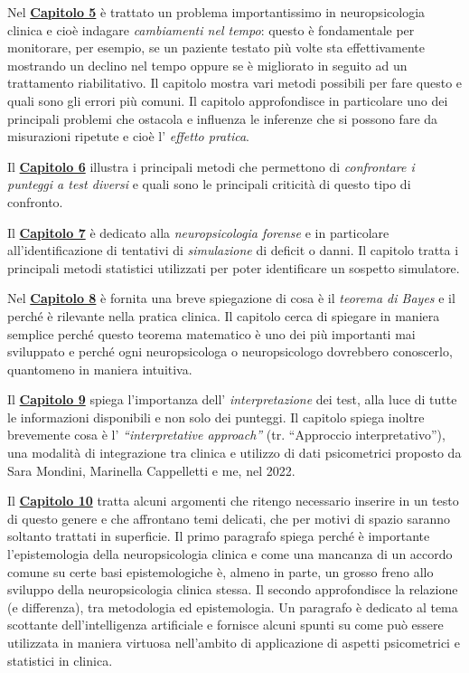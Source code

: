\documentclass[
  italian,
  letterpaper,
  paper=A4,
  headinclude=on,
  footinclude=on,
  12pt]{scrbook}
\begin{document}
Nel \hyperref[Capitolo-5]{\textbf{Capitolo 5}} è trattato un problema
importantissimo in neuropsicologia clinica e cioè indagare
\emph{cambiamenti nel tempo}: questo è fondamentale per monitorare, per
esempio, se un paziente testato più volte sta effettivamente mostrando
un declino nel tempo oppure se è migliorato in seguito ad un trattamento
riabilitativo. Il capitolo mostra vari metodi possibili per fare questo
e quali sono gli errori più comuni. Il capitolo approfondisce in
particolare uno dei principali problemi che ostacola e influenza le
inferenze che si possono fare da misurazioni ripetute e cioè l'
\emph{effetto pratica}.

Il \hyperref[Capitolo-6]{\textbf{Capitolo 6}} illustra i principali
metodi che permettono di \emph{confrontare i punteggi a test diversi} e
quali sono le principali criticità di questo tipo di confronto.

Il \hyperref[Capitolo-7]{\textbf{Capitolo 7}} è dedicato alla
\emph{neuropsicologia forense} e in particolare all'identificazione di
tentativi di \emph{simulazione} di deficit o danni. Il capitolo tratta i
principali metodi statistici utilizzati per poter identificare un
sospetto simulatore.

Nel \hyperref[Capitolo-8]{\textbf{Capitolo 8}} è fornita una breve
spiegazione di cosa è il \emph{teorema di Bayes} e il perché è rilevante
nella pratica clinica. Il capitolo cerca di spiegare in maniera semplice
perché questo teorema matematico è uno dei più importanti mai sviluppato
e perché ogni neuropsicologa o neuropsicologo dovrebbero conoscerlo,
quantomeno in maniera intuitiva.

Il \hyperref[Capitolo-9]{\textbf{Capitolo 9}} spiega l'importanza dell'
\emph{interpretazione} dei test, alla luce di tutte le informazioni
disponibili e non solo dei punteggi. Il capitolo spiega inoltre
brevemente cosa è l' \emph{``interpretative approach''} (tr. ``Approccio
interpretativo''), una modalità di integrazione tra clinica e utilizzo
di dati psicometrici proposto da Sara Mondini, Marinella Cappelletti e
me, nel 2022.

Il \hyperref[Capitolo-10]{\textbf{Capitolo 10}} tratta alcuni argomenti
che ritengo necessario inserire in un testo di questo genere e che
affrontano temi delicati, che per motivi di spazio saranno soltanto
trattati in superficie. Il primo paragrafo spiega perché è importante
l'epistemologia della neuropsicologia clinica e come una mancanza di un
accordo comune su certe basi epistemologiche è, almeno in parte, un
grosso freno allo sviluppo della neuropsicologia clinica stessa. Il
secondo approfondisce la relazione (e differenza), tra metodologia ed
epistemologia. Un paragrafo è dedicato al tema scottante
dell'intelligenza artificiale e fornisce alcuni spunti su come può
essere utilizzata in maniera virtuosa nell'ambito di applicazione di
aspetti psicometrici e statistici in clinica.
\end{document}
